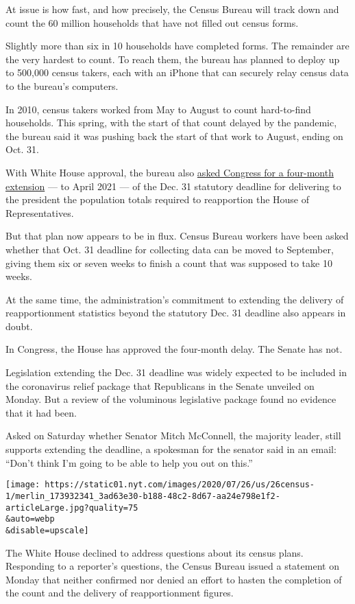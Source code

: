 At issue is how fast, and how precisely, the Census Bureau will track
down and count the 60 million households that have not filled out census
forms.

Slightly more than six in 10 households have completed forms. The
remainder are the very hardest to count. To reach them, the bureau has
planned to deploy up to 500,000 census takers, each with an iPhone that
can securely relay census data to the bureau's computers.

In 2010, census takers worked from May to August to count hard-to-find
households. This spring, with the start of that count delayed by the
pandemic, the bureau said it was pushing back the start of that work to
August, ending on Oct. 31.

With White House approval, the bureau also
\href{https://www.nytimes.com/2020/04/13/us/census-coronavirus-delay.html?searchResultPosition=9}{asked
Congress for a four-month extension} --- to April 2021 --- of the Dec.
31 statutory deadline for delivering to the president the population
totals required to reapportion the House of Representatives.

But that plan now appears to be in flux. Census Bureau workers have been
asked whether that Oct. 31 deadline for collecting data can be moved to
September, giving them six or seven weeks to finish a count that was
supposed to take 10 weeks.

At the same time, the administration's commitment to extending the
delivery of reapportionment statistics beyond the statutory Dec. 31
deadline also appears in doubt.

In Congress, the House has approved the four-month delay. The Senate has
not.

Legislation extending the Dec. 31 deadline was widely expected to be
included in the coronavirus relief package that Republicans in the
Senate unveiled on Monday. But a review of the voluminous legislative
package found no evidence that it had been.

Asked on Saturday whether Senator Mitch McConnell, the majority leader,
still supports extending the deadline, a spokesman for the senator said
in an email: ``Don't think I'm going to be able to help you out on
this.''

\texttt{[image: https://static01.nyt.com/images/2020/07/26/us/26census-1/merlin\_173932341\_3ad63e30-b188-48c2-8d67-aa24e798e1f2-articleLarge.jpg?quality=75\\\&auto=webp\\\&disable=upscale]}

The White House declined to address questions about its census plans.
Responding to a reporter's questions, the Census Bureau issued a
statement on Monday that neither confirmed nor denied an effort to
hasten the completion of the count and the delivery of reapportionment
figures.

